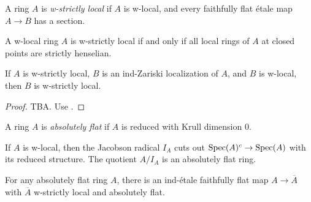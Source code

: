 \begin{definition}
    A ring \(A\) is \emph{w-strictly local} if \(A\) is w-local, and every faithfully flat \'etale map \(A \to B\) has a section.
    \label{def:w-strictly-local-ring}
\end{definition}

\begin{lemma}
    \label{lem:w-strictly-local-closed-points}

    A w-local ring $A$ is w-strictly local if and only if all local rings of $A$ at closed points are strictly henselian.
\end{lemma}

\begin{lemma}
    \label{lem:w-strictly-local-ind-Zariski-localization}
    If $A$ is w-strictly local, $B$ is an ind-Zariski localization of $A$, and $B$ is w-local, then $B$ is w-strictly local.
\end{lemma}

\begin{proof}

    TBA. Use .
\end{proof}

\begin{definition}
    A ring \(A\) is \emph{absolutely flat} if \(A\) is reduced with Krull dimension \(0\).
    \label{def:absolute-flat-ring}
\end{definition}

\begin{lemma}
    \label{lem:w-local-quotient-Jacobson-absolute-flat}

    If \(A\) is w-local, then the Jacobson radical \(I_A\) cuts out \(\operatorname{Spec}(A)^c \to \operatorname{Spec}(A)\) with its reduced structure. The quotient \(A/I_A\) is an absolutely flat ring.
\end{lemma}

\begin{lemma}
    \label{lem:absolute-flat-exists-ind-etale-w-strictly-local}

    For any absolutely flat ring $A$, there is an ind-étale faithfully flat map $A \to \overline{A}$ with $\overline{A}$ w-strictly local and absolutely flat. %
\end{lemma}

